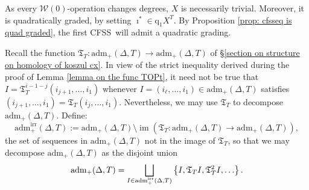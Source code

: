 \documentclass[11pt]{amsart} \renewcommand{\baselinestretch}{1.2}
\theoremstyle{plain}
\numberwithin{equation}{section} %
\theoremstyle{plain}
\numberwithin{equation}{chapter} %
\DeclareMathOperator{\im}{im}
\renewcommand{\to}{\longrightarrow}
\newcommand{\calw}{\mathcal{W}}
\newcommand{\quadgrad}[1]{\mathrm{q}_{#1}}
\newcommand{\aDT}{\mathrm{adm}_+(\Delta,T)}
\newcommand{\aDTirr}{\mathrm{adm}_+^\mathrm{irr}(\Delta,T)}
\newcommand{\TOP}{\mathfrak{T}}
\newcommand{\CFSS}{CFSS}
\begin{document}
\begin{Calculations of HWn}
As every $\calw(0)$-operation changes degrees, $X$ is necessarily trivial. Moreover, it is quadratically graded, by setting $\imath^*\in \quadgrad{1}X^T$. By Proposition \ref{prop: cfsseq is quad graded}, the first \CFSS\ will admit a quadratic grading.


Recall the function $\TOP_T:\aDT\to \aDT$ of \S\ref{section on structure on homology of koszul cx}. In view of the strict inequality derived during the proof of Lemma \ref{lemma on the func TOPt}, it need not be true that $I=\TOP_T^{i-1-j}(i_{j+1},\ldots,i_1)$ whenever  $I=(i_\ell,\ldots,i_1)\in \aDT$ satisfies $(i_{j+1},\ldots,i_1)=\TOP_T(i_{j},\ldots,i_1)$. Nevertheless, we may use $\TOP_T$ to decompose $\aDT$.
Define:
\[\aDTirr:= \aDT\setminus\im(\TOP_T:\aDT\to\aDT),\]
the set of sequences in $\aDT$ not in the image of $\TOP_T$, so that we may decompose $\aDT$ as the disjoint union
\[\aDT=\bigsqcup_{\smash{I\in \aDTirr}}\left\{I,\TOP_T I,\TOP_T^2I,\ldots\right\}.\]








\end{Calculations of HWn}
\end{document}
